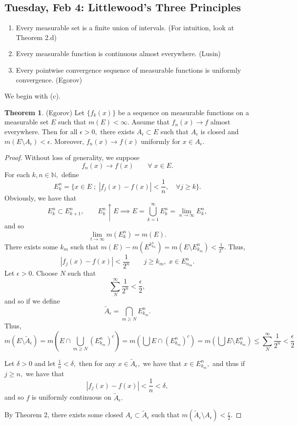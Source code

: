 \documentclass[10pt, oneside]{article}
\newcommand{\bbN}{\mathbb{N}}
\theoremstyle{definition}
\newtheorem{thm}{Theorem}
\begin{document}
\newpage
\subsection{Tuesday, Feb 4: Littlewood's Three Principles}
\begin{enumerate}
    \item Every measurable set is a finite union of intervals. (For intuition, look at Theorem 2.d)
    \item Every measurable function is continuous almost everywhere. (Lusin)
    \item Every pointwise convergence sequence of measurable functions is uniformly convergence. (Egorov)
\end{enumerate}
We begin with (c).
\begin{thm}
    (Egorov) Let $\{f_k(x)\}$ be a sequence on measurable functions on a measurable set $E$ such that $m(E) < \infty.$ Assume that $f_n(x) \to f$ almost everywhere. Then for all $\epsilon>0,$ there exists $A_\epsilon \subset E$ such that $A_\epsilon$ is closed and $m(E \setminus A_\epsilon) < \epsilon.$ Moreover, $f_n(x) \to f(x)$ uniformly for $x\in A_\epsilon.$
\end{thm}
\begin{proof}
    Without loss of generality, we suppose 
    \[f_n(x) \to f(x) \qquad \forall \; x\in E.\] For each $k,n \in \bbN,$ define 
    \[E_k^n = \{x \in E \; ; \; |f_j(x) - f(x)| < \frac{1}{n}, \quad \forall j\geq k\}.\]
    Obviously, we have that 
    \[E_k^n \subset E_{k+1}^n, \qquad E_{k}^n \uparrow E \implies E = \bigcup_{k=1}^\infty E_{k}^n = \lim_{n\to \infty}E_k^n,\] and so 
    \[\lim_{t\to \infty}m(E_k^n) = m(E).\] There exists some $k_m$ such that $m(E) - m(E^k^n_{k_m}) = m(E \setminus E^n_{k_m}) < \frac{1}{2^n}.$ Thus, 
    \[|f_j(x) - f(x)| < \frac{1}{2^n} \qquad j\geq k_m, \; x\in E^n_{n_m}.\] Let $\epsilon>0.$ Choose $N$ such that 
    \[\sum_{N}^\infty \frac{1}{2^n} < \frac{\epsilon}{2},\] and so if we define 
    \[\tilde{A}_\epsilon = \bigcap_{m\geq N} E^n_{k_m}.\] Thus, 
    \[m(E \setminus \tilde{A}_\epsilon) =m(E \cap \bigcup_{m\geq N} (E^n_{k_m})^c) = m(\bigcup E\cap (E^n_{k_m})^c) = m(\bigcup E\setminus E^n_{k_m}) \leq \sum_{N}^\infty \frac{1}{2^n} < \frac{\epsilon}{2}\]

    Let $\delta>0$ and let $\frac{1}{n}< \delta,$ then for any $x\in \tilde{A}_\epsilon,$ we have that $x\in E^n_{k_m},$ and thus if $j\geq n,$ we have that 
    \[|f_j(x) - f(x)|< \frac{1}{n}< \delta,\] and so $f$ is uniformly continuous on $\tilde{A}_\epsilon.$ 

    By Theorem 2, there exists some closed $A_\epsilon \subset \tilde{A}_\epsilon$ such that 
    $m(\tilde{A}_\epsilon \setminus A_\epsilon)< \frac{\epsilon}{2}.$ 
\end{proof}
\end{document}
